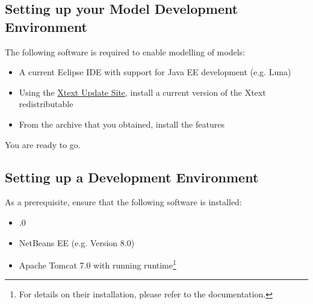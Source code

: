 
\subsection{Setting up your \MD Model Development Environment}

The following software is required to enable modelling of \MD models:

\begin{itemize}
\item A current Eclipse IDE with support for Java EE development (e.g. Luna)
\item Using the \href{https://eclipse.org/Xtext/download.html}{Xtext Update Site}, install a current version of the Xtext redistributable
\item From the archive that you obtained, install the \MD features
\end{itemize}

You are ready to go.


\subsection{Setting up a \mapapps Development Environment}
\label{subsec:basic-setup}

As a prerequisite, ensure that the following software is installed:

\begin{itemize}
\item {}.0
\item NetBeans EE (e.g. Version 8.0)
\item Apache Tomcat 7.0 with running \mapapps runtime\footnote{For details on their installation, please refer to the \mapapps documentation.}
\end{itemize}

